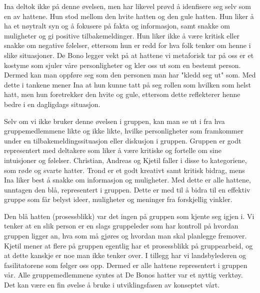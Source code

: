 Ina deltok ikke på denne øvelsen, men har likevel prøvd å idenfisere seg selv som en av hattene. Hun stod mellom den hvite hatten og den gule hatten. Hun liker å ha et nøytralt syn og å fokusere på fakta og informasjon, samt snakke om muligheter og gi positive tilbakemeldinger. Hun liker ikke å være kritisk eller snakke om negative følelser, ettersom hun er redd for hva folk tenker om henne i slike situasjoner. De Bono legger vekt på at hattene vi metaforisk tar på oss er et kostyme som sjuler våre personligheter og kler oss ut som en bestemt person. Dermed kan man oppføre seg som den personen man har "kledd seg ut" som. Med dette i tankene mener Ina at hun kunne tatt på seg rollen som hvilken som helst hatt, men hun foretrekker den hvite og gule, ettersom dette reflekterer henne bedre i en dagligdags situasjon.

Selv om vi ikke bruker denne øvelsen i gruppen, kan man se ut i fra hva gruppemedlemmene likte og ikke likte, hvilke personligheter som framkommer under en tilbakemeldingssituasjon eller diskusjon i gruppen. Gruppen er godt representert med deltakere som liker å være kritiske og fortelle om sine intuisjoner og følelser. Christian, Andreas og Kjetil faller i disse to kategoriene, som røde og svarte hatter. Trond er et godt kreativt samt kritisk bidrag, mens Ina liker best å snakke om informasjon og muligheter. Med dette er alle hattene, unntagen den blå, representert i gruppen. Dette er med til å bidra til en effektiv gruppe som får belyst ideer, muligheter og meninger fra forskjellig vinkler. 

Den blå hatten (prosessblikk) var det ingen på gruppen som kjente seg igjen i. Vi tenker at en slik person er en slags gruppeleder som har kontroll på hvordan gruppen ligger an, hva som må gjøres og hvordan man skal planlegge fremover. Kjetil mener at flere på gruppen egentlig har et prosessblikk på gruppearbeid, og at dette kanskje er noe man ikke tenker over. I tillegg har vi landsbylederen og fasilitatorene som følger oss opp. Dermed er alle hattene representert i gruppen vår.
Alle gruppemedlemmene syntes at De Bonos hatter var et nyttig verktøy. Det kan være en fin øvelse å bruke i utviklingsfasen av konseptet vårt. 


